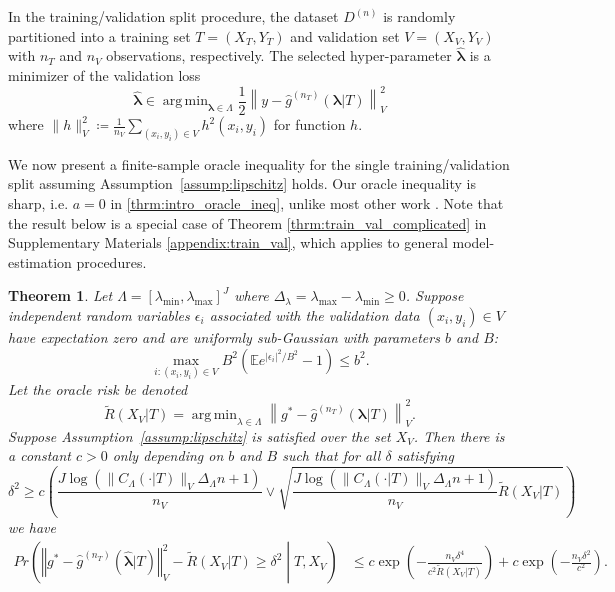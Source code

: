 \documentclass[12pt]{article} %
\newtheorem{theorem}{Theorem}
\theoremstyle{definition}
\DeclareMathOperator*{\argmin}{arg\,min}
\begin{document}
In the training/validation split procedure, the dataset $D^{(n)}$ is randomly partitioned into a training set $T = (X_T, Y_T)$ and validation set $V = (X_V, Y_V)$ with $n_T$ and $n_V$ observations, respectively.
The selected hyper-parameter $\hat{\boldsymbol{\lambda}}$ is a minimizer of the validation loss
\begin{equation}
\label{eq:train_val_lambda}
\hat{\boldsymbol \lambda} \in \argmin_{\boldsymbol{\lambda} \in\Lambda} \frac{1}{2} \left \| y-\hat{g}^{(n_T)}( \boldsymbol \lambda | T) \right \|_{V}^{2}
\end{equation}
where $\| h \|^2_{V} \coloneqq \frac{1}{n_V}\sum_{(x_i, y_i)\in V} h^2(x_i, y_i)$ for function $h$.

We now present a finite-sample oracle inequality for the single training/validation split assuming Assumption~\ref{assump:lipschitz} holds.
Our oracle inequality is sharp, i.e. $a=0$ in \eqref{thrm:intro_oracle_ineq}, unlike most other work \citep{gyorfi2006distribution, lecue2012oracle, van2003unified}.
Note that the result below is a special case of Theorem \ref{thrm:train_val_complicated} in Supplementary Materials \ref{appendix:train_val}, which applies to general model-estimation procedures.
\begin{theorem}
	\label{thrm:train_val}
	Let $\Lambda=[\lambda_{\min},\lambda_{\max}]^{J}$ where $\Delta_{\lambda} = \lambda_{\max} - \lambda_{\min} \ge 0$.
	Suppose independent random variables $\epsilon_i$ associated with the validation data $(x_i, y_i) \in V$ have expectation zero and are uniformly sub-Gaussian with parameters $b$ and $B$:
	$$
	\max_{i: (x_i, y_i) \in V} B^2 \left ( \mathbb{E} e^{|\epsilon_i|^2/B^2} - 1 \right ) \le b^2.
	$$
	Let the oracle risk be denoted
	\begin{equation}
	\tilde{R}(X_V|T) = \argmin_{\lambda \in \Lambda} \left \| g^*-\hat{g}^{(n_T)}( \boldsymbol{\lambda} | T) \right \|_{V}^{2}.
	\label{eq:tilde_lambda_def}
	\end{equation}
	Suppose Assumption~\ref{assump:lipschitz} is satisfied over the set $X_V$.
	Then there is a constant $c>0$ only depending on $b$ and $B$ such that for all $\delta$ satisfying
	\begin{equation}
	\delta^{2}
	\ge
	c \left (
	\frac{J \log(\|C_\Lambda(\cdot |T)\|_V \Delta_{\Lambda} n + 1)}{n_{V}}
	\vee 
	\sqrt{\frac{J \log(\|C_\Lambda(\cdot |T)\|_V \Delta_{\Lambda} n + 1)}{n_{V}}
		\tilde{R}(X_V|T)}
	\right )
	\label{thrm:train_val_delta}
	\end{equation}
	we have
	\begin{align}
	Pr\left(
	\left\Vert g^* - \hat{g}^{(n_T)}( \hat{\boldsymbol{\lambda}} | T) \right\Vert _{V}^2 -
	\tilde{R}(X_V|T)
	\ge\delta^2
	\middle | 
	T, X_V
	\right )
	&\le c\exp\left(-\frac{n_{V}\delta^{4}}{c^{2} \tilde{R}(X_V|T)}\right)
	+ c\exp\left(-\frac{n_{V}\delta^{2}}{c^{2}}\right).
	\end{align}
	
\end{theorem}
\end{document}
